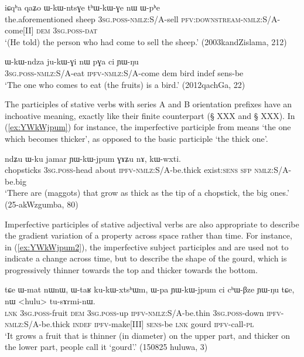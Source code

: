 \begin{exe}
\ex \label{ex:WkWntsGe.thWkWGe}
\gll iɕqʰa qaʑo ɯ-kɯ-ntsɣe tʰɯ-kɯ-ɣe nɯ ɯ-pʰe \\
the.aforementioned sheep \textsc{3sg}.\textsc{poss}-\textsc{nmlz}:S/A-sell \textsc{pfv}:\textsc{downstream}-\textsc{nmlz}:S/A-come[II] \textsc{dem} \textsc{3sg}.\textsc{poss}-\textsc{dat} \\
\glt  `(He told) the person who had come to sell the sheep.' (2003kandZislama, 212)
\end{exe}

\begin{exe}
\ex \label{ex:WkWndza.jukWGi}
\gll ɯ-kɯ-ndza ju-kɯ-ɣi nɯ pɣa ci ɲɯ-ŋu \\
\textsc{3sg}.\textsc{poss}-\textsc{nmlz}:S/A-eat \textsc{ipfv}-\textsc{nmlz}:S/A-come dem bird indef sens-be \\
\glt   `The one who comes to eat (the fruits) is a bird.' (2012qachGa, 22)
\end{exe}

The participles of stative verbs with series A and B orientation prefixes have an inchoative meaning, exactly like their finite counterpart (§ XXX and § XXX).  In (\ref{ex:YWkWjpum}) for instance, the imperfective participle  from  means `the one which becomes thicker', as opposed to the basic participle  `the thick one'.

\begin{exe}
\ex \label{ex:YWkWjpum}
 \gll ndʑu ɯ-ku jamar ɲɯ-kɯ-jpum ɣɤʑu nɤ, kɯ-wxti.  \\
 chopsticks \textsc{3sg}.\textsc{poss}-head about \textsc{ipfv}-\textsc{nmlz}:S/A-be.thick exist:\textsc{sens} \textsc{sfp} \textsc{nmlz}:S/A-be.big \\
 \glt  `There are (maggots) that grow as thick as the tip of a chopstick, the big ones.' (25-akWzgumba, 80)
\end{exe}

Imperfective participles of stative adjectival verbs are also appropriate to describe the gradient variation of a property across space rather than time. For instance, in (\ref{ex:YWkWjpum2}), the imperfective subject participles  and  are used not to indicate a change across time, but to describe the shape of the gourd, which is progressively thinner towards the top and thicker towards the bottom.

\begin{exe}
\ex \label{ex:YWkWjpum2}
 \gll  tɕe ɯ-mat nɯnɯ, ɯ-taʁ ku-kɯ-xtsʰɯm, ɯ-pa ɲɯ-kɯ-jpum ci cʰɯ-βze ɲɯ-ŋu tɕe, nɯ <hulu> tu-sɤrmi-nɯ. \\
 \textsc{lnk} \textsc{3sg}.\textsc{poss}-fruit \textsc{dem} \textsc{3sg}.\textsc{poss}-up \textsc{ipfv}-\textsc{nmlz}:S/A-be.thin \textsc{3sg}.\textsc{poss}-down \textsc{ipfv}-\textsc{nmlz}:S/A-be.thick \textsc{indef} \textsc{ipfv}-make[III]  \textsc{sens}-be \textsc{lnk} gourd \textsc{ipfv}-call-\textsc{pl} \\
 \glt `It grows a fruit that is thinner (in diameter) on the upper part, and thicker on the lower part, people call it `gourd'.' (150825 huluwa, 3)
\end{exe}

